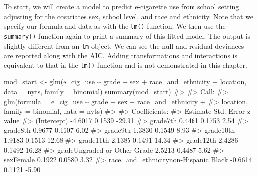 \documentclass[
  letterpaper,
]{krantz}
\makeatletter
\newenvironment{Shaded}{\begin{snugshade}}{\end{snugshade}}
\newcommand{\AttributeTok}[1]{\textcolor[rgb]{0.40,0.45,0.13}{#1}}
\newcommand{\CommentTok}[1]{\textcolor[rgb]{0.37,0.37,0.37}{#1}}
\newcommand{\FunctionTok}[1]{\textcolor[rgb]{0.28,0.35,0.67}{#1}}
\newcommand{\NormalTok}[1]{\textcolor[rgb]{0.00,0.23,0.31}{#1}}
\newcommand{\OtherTok}[1]{\textcolor[rgb]{0.00,0.23,0.31}{#1}}
\newcommand{\SpecialCharTok}[1]{\textcolor[rgb]{0.37,0.37,0.37}{#1}}
\newenvironment{kframe}{%
\medskip{}
\setlength{\fboxsep}{.8em}
 \def\at@end@of@kframe{}%
 \ifinner\ifhmode%
  \def\at@end@of@kframe{\end{minipage}}%
  \begin{minipage}{\columnwidth}%
 \fi\fi%
 \def\FrameCommand##1{\hskip\@totalleftmargin \hskip-\fboxsep
 \colorbox{shadecolor}{##1}\hskip-\fboxsep
     \hskip-\linewidth \hskip-\@totalleftmargin \hskip\columnwidth}%
 \MakeFramed {\advance\hsize-\width
   \@totalleftmargin\z@ \linewidth\hsize
   \@setminipage}}%
 {\par\unskip\endMakeFramed%
 \at@end@of@kframe}
\renewenvironment{Shaded}{\begin{kframe}}{\end{kframe}}
\makeatother
\begin{document}
To start, we will create a model to predict e-cigarette use from school
setting adjusting for the covariates sex, school level, and race and
ethnicity. Note that we specify our formula and data as with the
\texttt{lm()} function. We then use the \texttt{summary()} function
again to print a summary of this fitted model. The output is slightly
different from an \texttt{lm} object. We can see the null and residual
deviances are reported along with the AIC. Adding transformations and
interactions is equivalent to that in the \texttt{lm()} function and is
not demonstrated in this chapter.

\begin{Shaded}
\begin{Highlighting}[]
\NormalTok{mod\_start }\OtherTok{\textless{}{-}} \FunctionTok{glm}\NormalTok{(e\_cig\_use }\SpecialCharTok{\textasciitilde{}}\NormalTok{ grade }\SpecialCharTok{+}\NormalTok{ sex }\SpecialCharTok{+}\NormalTok{ race\_and\_ethnicity }\SpecialCharTok{+} 
\NormalTok{                   location, }\AttributeTok{data =}\NormalTok{ nyts, }\AttributeTok{family =}\NormalTok{ binomial)}
\FunctionTok{summary}\NormalTok{(mod\_start)}
\CommentTok{\#\textgreater{} }
\CommentTok{\#\textgreater{} Call:}
\CommentTok{\#\textgreater{} glm(formula = e\_cig\_use \textasciitilde{} grade + sex + race\_and\_ethnicity + }
\CommentTok{\#\textgreater{}     location, family = binomial, data = nyts)}
\CommentTok{\#\textgreater{} }
\CommentTok{\#\textgreater{} Coefficients:}
\CommentTok{\#\textgreater{}                                           Estimate Std. Error z value}
\CommentTok{\#\textgreater{} (Intercept)                                {-}4.6017     0.1539  {-}29.91}
\CommentTok{\#\textgreater{} grade7th                                    0.4461     0.1753    2.54}
\CommentTok{\#\textgreater{} grade8th                                    0.9677     0.1607    6.02}
\CommentTok{\#\textgreater{} grade9th                                    1.3830     0.1549    8.93}
\CommentTok{\#\textgreater{} grade10th                                   1.9183     0.1513   12.68}
\CommentTok{\#\textgreater{} grade11th                                   2.1385     0.1491   14.34}
\CommentTok{\#\textgreater{} grade12th                                   2.4286     0.1492   16.28}
\CommentTok{\#\textgreater{} gradeUngraded or Other Grade                2.5213     0.4487    5.62}
\CommentTok{\#\textgreater{} sexFemale                                   0.1922     0.0580    3.32}
\CommentTok{\#\textgreater{} race\_and\_ethnicitynon{-}Hispanic Black       {-}0.6614     0.1121   {-}5.90}

\end{Highlighting}
\end{Shaded}
\end{document}
